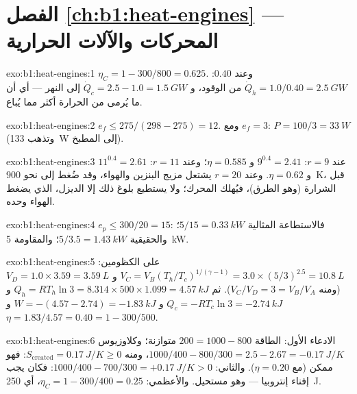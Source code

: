 \section*{الفصل \ref{ch:b1:heat-engines} --- المحركات والآلات الحرارية}

\begin{solution}{exo:b1:heat-engines:1}
$\eta_C = 1 - 300/800 = 0.625$. وعند $0.40$: $\dot Q_h = 1.0/0.40 = \qty{2.5}{GW}$
من الوقود، و $\dot Q_c = 2.5 - 1.0 = \qty{1.5}{GW}$ إلى النهر --- أي أن ما
يُرمى من الحرارة أكثر مما يُباع.
\end{solution}

\begin{solution}{exo:b1:heat-engines:2}
$e_f \leq 275/(298 - 275) = 12$. ومع $e_f = 3$: $P = 100/3 = \qty{33}{W}$
(وتذهب \qty{133}{W} إلى المطبخ).
\end{solution}

\begin{solution}{exo:b1:heat-engines:3}
عند $r = 9$: $9^{0.4} = 2.41$ و $\eta = 0.585$؛ وعند $r = 11$: $11^{0.4} = 2.61$
و $\eta = 0.62$. وعند $r = 20$ يشتعل مزيج البنزين والهواء، وقد ضُغط إلى نحو
\qty{900}{K}، قبل الشرارة (وهو الطرق)، فيُهلك
المحرك؛ ولا يستطيع بلوغ ذلك إلا الديزل، الذي يضغط الهواء وحده.
\end{solution}

\begin{solution}{exo:b1:heat-engines:4}
$e_p \leq 300/20 = 15$: فالاستطاعة المثالية $5/15 = \qty{0.33}{kW}$؛ والحقيقية $5/3.5 =
\qty{1.43}{kW}$؛ والمقاومة \qty{5}{kW}.
\end{solution}

\begin{solution}{exo:b1:heat-engines:5}
على الكظومين: $V_C = V_B(T_h/T_c)^{1/(\gamma-1)} = 3.0 \times (5/3)^{2.5} =
\qty{10.8}{L}$ و $V_D = 1.0 \times 3.59 = \qty{3.59}{L}$ (ومنه $V_C/V_D = 3 =
V_B/V_A$). ثم $Q_h = RT_h\ln3 = 8.314 \times 500 \times 1.099 = \qty{4.57}{kJ}$
و $Q_c = -RT_c\ln3 = \qty{-2.74}{kJ}$ و $W = -(4.57 - 2.74) = \qty{-1.83}{kJ}$
و $\eta = 1.83/4.57 = 0.40 = 1 - 300/500$.
\end{solution}

\begin{solution}{exo:b1:heat-engines:6}
الادعاء الأول: الطاقة $200 = 1000 - 800$ متوازنة؛ وكلاوزيوس $1000/400 - 800/300
= 2.5 - 2.67 = \qty{-0.17}{J/K}$، ومنه $S_{\mathrm{created}} = \qty{0.17}{J/K} \geq 0$:
فهو ممكن (مع $\eta = 0.20$). والثاني: $1000/400 - 700/300 = +\qty{0.17}{J/K} > 0$:
فكان يجب إفناء إنتروبيا --- وهو مستحيل. والأعظمي: $\eta_C = 1 -
300/400 = 0.25$، أي \qty{250}{J}.
\end{solution}


